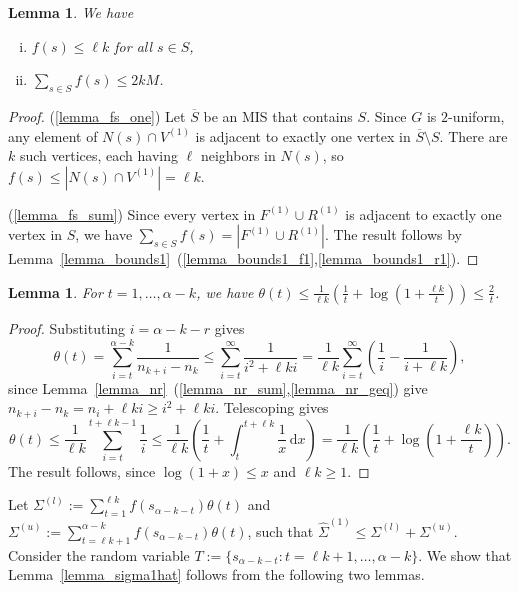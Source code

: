 \documentclass{article}
\theoremstyle{plain}
\theoremstyle{remark}
\theoremstyle{plain}
\newtheorem{lemma}[theorem]{Lemma}
\numberwithin{equation}{section}
\begin{document}
	\begin{lemma}\label{lemma_fs}
		We have
		\begin{enumerate}[(i)]
			\item\label{lemma_fs_one} $f(s)\leq\ell k$ for all $s\in S$,
			\item\label{lemma_fs_sum} $\sum_{s\in S}f(s)\leq2kM$.
		\end{enumerate}
	\end{lemma}
	
	\begin{proof}
		(\ref{lemma_fs_one}) Let $\overline{S}$ be an MIS that contains $S$. Since $G$ is $2$-uniform, any element of $N(s)\cap V^{(1)}$ is adjacent to exactly one vertex in $\overline{S}\setminus S$. There are $k$ such vertices, each having $\ell$ neighbors in $N(s)$, so $f(s)\leq|N(s)\cap V^{(1)}|=\ell k$.
		
		(\ref{lemma_fs_sum}) Since every vertex in $F^{(1)}\cup R^{(1)}$ is adjacent to exactly one vertex in $S$, we have $\sum_{s\in S}f(s)=|F^{(1)}\cup R^{(1)}|$. The result follows by Lemma~\ref{lemma_bounds1}~(\ref{lemma_bounds1_f1},\ref{lemma_bounds1_r1}).
	\end{proof}
	
	\begin{lemma}\label{lemma_theta}
		For $t=1,\ldots,\alpha-k$, we have $\theta(t)\leq\frac{1}{\ell k}(\frac1t+\log(1+\frac{\ell k}{t}))\leq\frac2t$.
	\end{lemma}
	
	\begin{proof}
		Substituting $i=\alpha-k-r$ gives $$\theta(t)=\sum_{i=t}^{\alpha-k}\frac1{n_{k+i}-n_k}\leq\sum_{i=t}^{\infty}\frac1{i^2+\ell ki}=\frac1{\ell k}\sum_{i=t}^{\infty}\left(\frac1{i}-\frac1{i+\ell k}\right),$$ since Lemma~\ref{lemma_nr}~(\ref{lemma_nr_sum},\ref{lemma_nr_geq}) give $n_{k+i}-n_k=n_i+\ell ki\geq i^2+\ell ki$. Telescoping gives $$\theta(t)\leq\frac1{\ell k}\sum_{i=t}^{t+\ell k-1}\frac1{i}\leq\frac1{\ell k}\left(\frac1{t}+\int_t^{t+\ell k}\frac1x\,\mathrm{d}x\right)=\frac1{\ell k}\left(\frac1{t}+\log\left(1+\frac{\ell k}{t}\right)\right).$$ The result follows, since $\log(1+x)\leq x$ and $\ell k\geq1$.
	\end{proof}
	
	Let $\Sigma^{(l)}:=\sum_{t=1}^{\ell k}f(s_{\alpha-k-t})\theta(t)$ and $\Sigma^{(u)}:=\sum_{t=\ell k+1}^{\alpha-k}f(s_{\alpha-k-t})\theta(t)$, such that $\hat{\Sigma}^{(1)}\leq\Sigma^{(l)}+\Sigma^{(u)}$. Consider the random variable $T:=\{s_{\alpha-k-t}:t=\ell k+1,\ldots,\alpha-k\}$. We show that Lemma~\ref{lemma_sigma1hat} follows from the following two lemmas.
	
\end{document}
